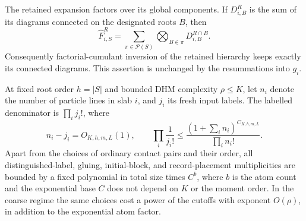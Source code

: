 \begin{lemma}\label{lem:diagram-labels}
The retained expansion factors over its global components.  If
$D^R_{i,B}$ is the sum of its diagrams connected on the designated roots
$B$, then
\begin{equation}\label{eq:component-exponential-formula}
 \widehat F^R_{i,S}
       =\sum_{\pi\in\mathcal P(S)}
                         \bigotimes_{B\in\pi}D^{R\cap B}_{i,B}.
\end{equation}
Consequently factorial-cumulant inversion of the retained hierarchy
keeps exactly its connected diagrams.  This assertion is unchanged by
the resummations into $g_i$.

At fixed root order $h=|S|$ and bounded DHM complexity $\rho\le K$,
let $n_i$ denote the number of
particle lines in slab $i$, and $j_i$ its fresh input labels.  The
labelled denominator is $\prod_i j_i!$, where
\begin{equation}\label{eq:bounded-crossing-factorials}
 n_i-j_i=O_{K,h,m,L}(1),\qquad
 \prod_i\frac1{j_i!}
      \le\frac{(1+\sum_i n_i)^{C_{K,h,m,L}}}{\prod_i n_i!}.
\end{equation}
Apart from the choices of ordinary contact pairs and their order, all
distinguished-label, gluing, initial-block, and record-placement
multiplicities are bounded by a fixed polynomial in total size times
$C^b$, where $b$ is the atom count and the exponential base $C$ does not
depend on $K$ or the moment order.  In the coarse regime the same
choices cost a power of the cutoffs with exponent $O(\rho)$, in addition
to the exponential atom factor.
\end{lemma}

